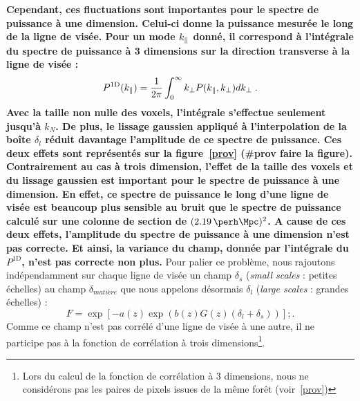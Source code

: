 \documentclass[11pt, twoside, a4paper, openright]{report}
\begin{document}
\textbf{
  Cependant, ces fluctuations sont importantes pour le spectre de puissance à une dimension. Celui-ci donne la puissance mesurée le long de la ligne de visée. Pour un mode $k_{\parallel}{}$ donné, il correspond à l'intégrale du spectre de puissance à 3 dimensions sur la direction transverse à la ligne de visée :
\begin{equation}
  \label{eq:p1d}
  P^{\mathrm{1D}}(k_{\parallel}{}) = \frac{1}{2 \pi} \int_{0}^{\infty} k_{\perp}{} P(k_{\parallel}{}, k_{\perp}{}) dk_{\perp}{} \; .
\end{equation}
Avec la taille non nulle des voxels, l'intégrale s'effectue seulement jusqu'à $k_N$. De plus, le lissage gaussien appliqué à l'interpolation de la boîte $\delta_l$ réduit davantage l'amplitude de ce spectre de puissance. Ces deux effets sont représentés sur la figure~\ref{prov} (\#prov faire la figure). Contrairement au cas à trois dimension, l'effet de la taille des voxels et du lissage gaussien est important pour le spectre de puissance à une dimension.
En effet, ce spectre de puissance le long d'une ligne de visée est beaucoup plus sensible au bruit que le spectre de puissance calculé sur une colonne de section de $(\SI{2.19}{\perh\Mpc})^2$.
A cause de ces deux effets, l'amplitude du spectre de puissance à une dimension n'est pas correcte. Et ainsi, la variance du champ, donnée par l'intégrale du $P^{\mathrm{1D}}$, n'est pas correcte non plus.
}
Pour palier ce problème, nous rajoutons indépendamment sur chaque ligne de visée un champ $\delta_s$ (\emph{small scales} : petites échelles) au champ $\delta_{matière}$ que nous appelons désormais $\delta_{l}$ (\emph{large scales} : grandes échelles) :
\begin{equation}
  \label{eq:fgpa3}
  F = \exp\left[ - a(z) \exp(b(z) G(z) (\delta_l + \delta_s))\right] ;.
\end{equation}
Comme ce champ n'est pas corrélé d'une ligne de visée à une autre, il ne participe pas à la fonction de corrélation à trois dimensions\footnote{Lors du calcul de la fonction de corrélation à 3 dimensions, nous ne considérons pas les paires de pixels issues de la même forêt (voir~\ref{prov})}.
\end{document}
